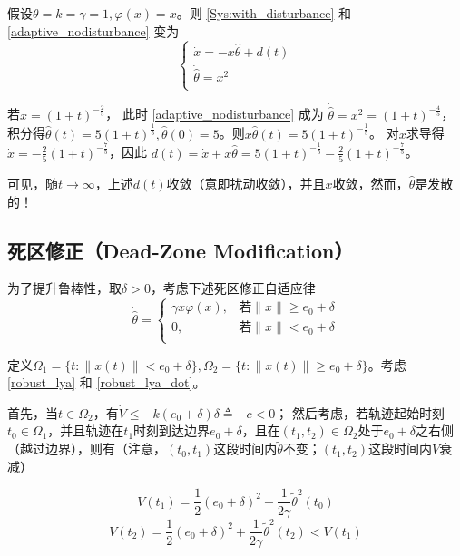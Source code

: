 \begin{example}[扰动衰减但参数估计发散]
    假设\(\theta = k = \gamma = 1,\varphi(x) = x\)。则 \eqref{Sys:with_disturbance} 和 \eqref{adaptive_nodisturbance} 变为
\[\begin{cases}
\dot{x} = - x\hat{\theta} + d(t) \\
\dot{\hat{\theta}} = x^{2} \\
\end{cases}\]

若$x = (1 + t)^{- \frac{2}{5}} $，
此时 \eqref{adaptive_nodisturbance} 成为
$\dot{\hat{\theta}} = x^{2} = (1 + t)^{- \frac{4}{5}} $，
积分得$\hat{\theta}(t) = 5(1 + t)^{\frac{1}{5}},\hat{\theta}(0) = 5$。则\(x\hat{\theta}(t) = 5(1 + t)^{- \frac{1}{5}}\)。
对$x$求导得$\dot{x} = - \frac{2}{5}(1 + t)^{- \frac{7}{5}}$，因此
$d(t) = \dot{x} + x\hat{\theta} = 5(1 + t)^{- \frac{1}{5}} - \frac{2}{5}(1 + t)^{- \frac{7}{5}}$。

可见，随$t\to\infty$，上述\(d(t)\)收敛（意即扰动收敛），并且\(x\)收敛，然而，\(\hat{\theta}\)是发散的！
\end{example}

\subsection{死区修正（Dead-Zone Modification）}

为了提升鲁棒性，取$\delta>0$，考虑下述死区修正自适应律
\[\dot{\hat{\theta}} = \left\{\begin{matrix}
\gamma x\varphi(x), & \text{若} \| x \| \geq e_{0} + \delta \\
0, & \text{若} \| x \| < e_{0} + \delta \\
\end{matrix}\right.\]

定义\(\Omega_{1} = \{ t: \| x(t) \| < e_{0} + \delta\},\Omega_{2} = \{ t: \| x(t) \| \geq e_{0} + \delta\}\)。考虑\eqref{robust_lya} 和 \eqref{robust_lya_dot}。

首先，当\(t \in \Omega_{2}\)，有\(\dot{V} \leq - k(e_{0} + \delta)\delta \triangleq - c < 0\)；
然后考虑，若轨迹起始时刻\(t_{0} \in \Omega_{1}\)，并且轨迹在\(t_{1}\)时刻到达边界\(e_{0} + \delta\)，且在\((t_{1},t_{2}) \in \Omega_{2}\)处于\(e_{0} + \delta\)之右侧（越过边界），则有（注意，$(t_0,t_1)$这段时间内$\tilde{\theta}$不变；$(t_1,t_2)$这段时间内$V$衰减）

\[V(t_{1}) = \frac{1}{2}(e_{0} + \delta)^{2} + \frac{1}{2\gamma}{\tilde{\theta}}^{2}(t_{0})\]
\[V(t_{2}) = \frac{1}{2}(e_{0} + \delta)^{2} + \frac{1}{2\gamma}{\tilde{\theta}}^{2}(t_{2}) < V(t_{1})\]

